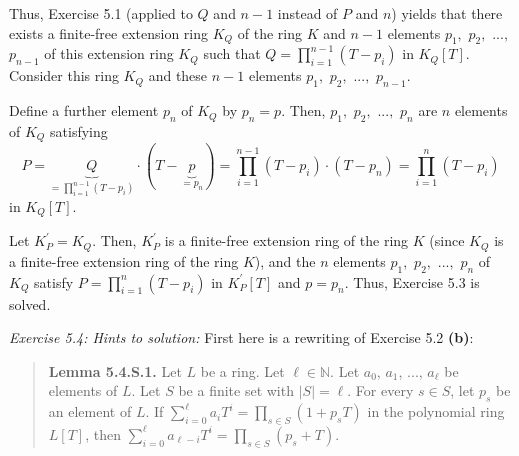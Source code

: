 \documentclass[numbers=enddot,12pt,final,onecolumn,notitlepage]{scrartcl}%
\begin{document}
Thus, Exercise 5.1 (applied to $Q$ and $n-1$ instead of $P$ and $n$) yields
that there exists a finite-free extension ring $K_{Q}$ of the ring $K$ and
$n-1$ elements $p_{1},$ $p_{2},$ $...,$ $p_{n-1}$ of this extension ring
$K_{Q}$ such that $Q=\prod\limits_{i=1}^{n-1}\left(  T-p_{i}\right)  $ in
$K_{Q}\left[  T\right]  $. Consider this ring $K_{Q}$ and these $n-1$ elements
$p_{1},$ $p_{2},$ $...,$ $p_{n-1}$.

Define a further element $p_{n}$ of $K_{Q}$ by $p_{n}=p$. Then, $p_{1},$
$p_{2},$ $...,$ $p_{n}$ are $n$ elements of $K_{Q}$ satisfying%
\[
P=\underbrace{Q}_{=\prod\limits_{i=1}^{n-1}\left(  T-p_{i}\right)  }%
\cdot\left(  T-\underbrace{p}_{=p_{n}}\right)  =\prod\limits_{i=1}%
^{n-1}\left(  T-p_{i}\right)  \cdot\left(  T-p_{n}\right)  =\prod
\limits_{i=1}^{n}\left(  T-p_{i}\right)
\]
in $K_{Q}\left[  T\right]  $.

Let $K_{P}^{\prime}=K_{Q}$. Then, $K_{P}^{\prime}$ is a finite-free extension
ring of the ring $K$ (since $K_{Q}$ is a finite-free extension ring of the
ring $K$), and the $n$ elements $p_{1},$ $p_{2},$ $...,$ $p_{n}$ of $K_{Q}$
satisfy $P=\prod\limits_{i=1}^{n}\left(  T-p_{i}\right)  $ in $K_{P}^{\prime
}\left[  T\right]  $ and $p=p_{n}$. Thus, Exercise 5.3 is solved.

\textit{Exercise 5.4: Hints to solution:} First here is a rewriting of
Exercise 5.2 \textbf{(b)}:

\begin{quote}
\textbf{Lemma 5.4.S.1.} Let $L$ be a ring. Let $\ell\in\mathbb{N}$. Let
$a_{0}$, $a_{1}$, $...$, $a_{\ell}$ be elements of $L$. Let $S$ be a finite
set with $\left\vert S\right\vert =\ell$. For every $s\in S$, let $p_{s}$ be
an element of $L$. If $\sum\limits_{i=0}^{\ell}a_{i}T^{i}=\prod\limits_{s\in
S}\left(  1+p_{s}T\right)  $ in the polynomial ring $L\left[  T\right]  $,
then $\sum\limits_{i=0}^{\ell}a_{\ell-i}T^{i}=\prod\limits_{s\in S}\left(
p_{s}+T\right)  $.
\end{quote}
\end{document}
